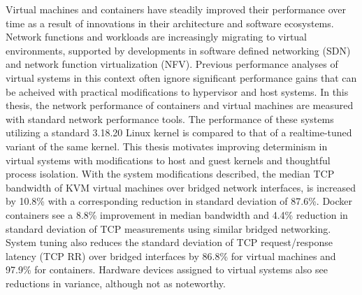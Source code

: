 Virtual machines and containers have steadily improved their performance over time as a result of innovations in their architecture and software ecosystems.
Network functions and workloads are increasingly migrating to virtual environments, supported by developments in software defined networking (SDN) and network function virtualization (NFV).
Previous performance analyses of virtual systems in this context often ignore significant performance gains that can be acheived with practical modifications to hypervisor and host systems.
In this thesis, the network performance of containers and virtual machines are measured with standard network performance tools.
The performance of these systems utilizing a standard 3.18.20 Linux kernel is compared to that of a realtime-tuned variant of the same kernel.  
This thesis motivates improving determinism in virtual systems with modifications to host and guest kernels and thoughtful process isolation. 
With the system modifications described, the median TCP bandwidth of KVM virtual machines over bridged network interfaces, is increased by 10.8\% with a corresponding reduction in standard deviation of 87.6\%.
Docker containers see a 8.8\% improvement in median bandwidth and 4.4\% reduction in standard deviation of TCP measurements using similar bridged networking.
System tuning also reduces the standard deviation of TCP request/response latency (TCP RR) over bridged interfaces by 86.8\% for virtual machines and 97.9\% for containers.
Hardware devices assigned to virtual systems also see reductions in variance, although not as noteworthy.


